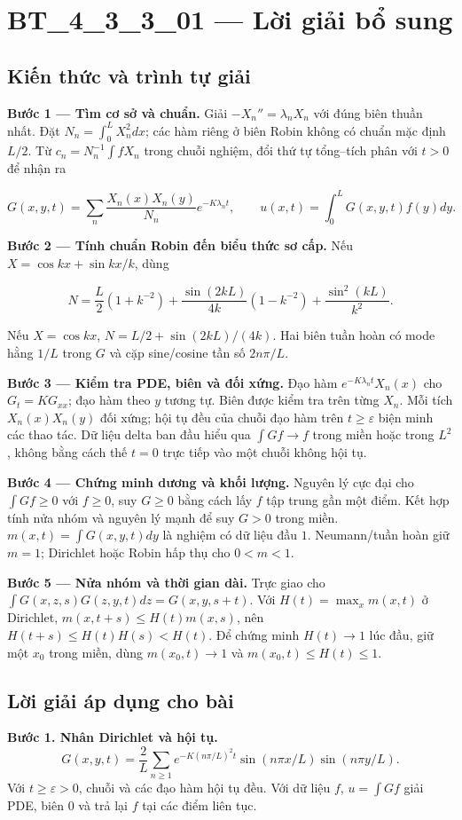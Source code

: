 \documentclass[10pt,a4paper]{article}
\begin{document}
\section*{BT\_4\_3\_3\_01 — Lời giải bổ sung}
\subsection*{Kiến thức và trình tự giải}
\textbf{Bước 1 — Tìm cơ sở và chuẩn.} Giải $-X_n''=\lambda_nX_n$ với đúng biên thuần nhất. Đặt $N_n=\int_0^LX_n^2dx$; các hàm riêng ở biên Robin không có chuẩn mặc định $L/2$. Từ $c_n=N_n^{-1}\int fX_n$ trong chuỗi nghiệm, đổi thứ tự tổng–tích phân với $t>0$ để nhận ra


\[
G(x,y,t)=\sum_n\frac{X_n(x)X_n(y)}{N_n}e^{-K\lambda_nt},\qquad
u(x,t)=\int_0^LG(x,y,t)f(y)dy.
\]


\textbf{Bước 2 — Tính chuẩn Robin đến biểu thức sơ cấp.} Nếu $X=\cos kx+\sin kx/k$, dùng


\[
N=\frac L2(1+k^{-2})+\frac{\sin(2kL)}{4k}(1-k^{-2})+\frac{\sin^2(kL)}{k^2}.
\]


Nếu $X=\cos kx$, $N=L/2+\sin(2kL)/(4k)$. Hai biên tuần hoàn có mode hằng $1/L$ trong $G$ và cặp sine/cosine tần số $2n\pi/L$.

\textbf{Bước 3 — Kiểm tra PDE, biên và đối xứng.} Đạo hàm $e^{-K\lambda_nt}X_n(x)$ cho $G_t=KG_{xx}$; đạo hàm theo $y$ tương tự. Biên được kiểm tra trên từng $X_n$. Mỗi tích $X_n(x)X_n(y)$ đối xứng; hội tụ đều của chuỗi đạo hàm trên $t\ge\varepsilon$ biện minh các thao tác. Dữ liệu delta ban đầu hiểu qua $\int Gf\to f$ trong miền hoặc trong $L^2$, không bằng cách thế $t=0$ trực tiếp vào một chuỗi không hội tụ.

\textbf{Bước 4 — Chứng minh dương và khối lượng.} Nguyên lý cực đại cho $\int Gf\ge0$ với $f\ge0$, suy $G\ge0$ bằng cách lấy $f$ tập trung gần một điểm. Kết hợp tính nửa nhóm và nguyên lý mạnh để suy $G>0$ trong miền. $m(x,t)=\int G(x,y,t)dy$ là nghiệm có dữ liệu đầu $1$. Neumann/tuần hoàn giữ $m=1$; Dirichlet hoặc Robin hấp thụ cho $0<m<1$.

\textbf{Bước 5 — Nửa nhóm và thời gian dài.} Trực giao cho $\int G(x,z,s)G(z,y,t)dz=G(x,y,s+t)$. Với $H(t)=\max_xm(x,t)$ ở Dirichlet, $m(x,t+s)\le H(t)m(x,s)$, nên $H(t+s)\le H(t)H(s)<H(t)$. Để chứng minh $H(t)\to1$ lúc đầu, giữ một $x_0$ trong miền, dùng $m(x_0,t)\to1$ và $m(x_0,t)\le H(t)\le1$.
\subsection*{Lời giải áp dụng cho bài}
\textbf{Bước 1. Nhân Dirichlet và hội tụ.}
\[G(x,y,t)=\frac2L\sum_{n\ge1}e^{-K(n\pi/L)^2t}
\sin(n\pi x/L)\sin(n\pi y/L).\]
Với $t\ge\varepsilon>0$, chuỗi và các đạo hàm hội tụ đều. Với dữ liệu $f$, $u=\int Gf$ giải PDE, biên $0$ và trả lại $f$ tại các điểm liên tục.
\end{document}

